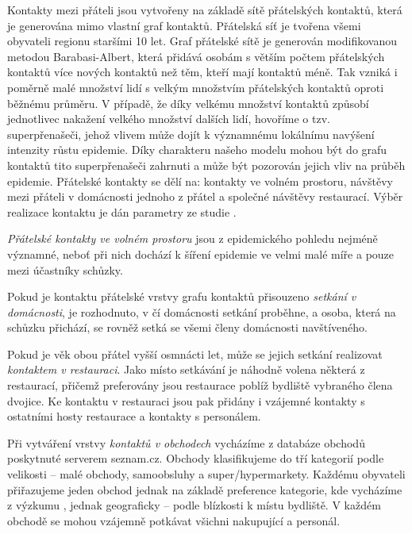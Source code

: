 Kontakty mezi přáteli jsou vytvořeny na základě sítě přátelských kontaktů, která je generována mimo vlastní graf kontaktů. Přátelská síť je tvořena všemi obyvateli regionu staršími 10 let. Graf přátelské sítě je generován modifikovanou metodou Barabasi-Albert, která přidává osobám s větším počtem přátelských kontaktů více nových kontaktů než těm, kteří mají kontaktů méně. Tak vzniká i poměrně malé množství lidí s velkým množstvím přátelských kontaktů oproti běžnému průměru. V případě, že díky velkému množství kontaktů způsobí jednotlivec nakažení velkého množství dalších lidí, hovoříme o tzv. superpřenašeči, jehož vlivem může dojít k významnému lokálnímu navýšení intenzity růstu epidemie. Díky charakteru našeho modelu mohou být do grafu kontaktů tito superpřenašeči zahrnuti a může být pozorován jejich vliv na průběh epidemie.
Přátelské kontakty se dělí na: kontakty ve volném prostoru, návštěvy mezi přáteli v domácnosti jednoho z přátel a společné návštěvy restaurací. Výběr realizace kontaktu je dán parametry ze studie \cite{zaj:medianlife}.

\emph{Přátelské kontakty ve volném prostoru} jsou z epidemického pohledu nejméně významné, neboť při nich dochází k šíření epidemie ve velmi malé míře a pouze mezi účastníky schůzky.

Pokud je kontaktu přátelské vrstvy grafu kontaktů přisouzeno \emph{setkání v domácnosti}, je rozhodnuto, v čí domácnosti setkání proběhne, a osoba, která na schůzku přichází, se rovněž setká se všemi členy domácnosti navštíveného.

Pokud je věk obou přátel vyšší osmnácti let, může se jejich setkání realizovat \emph{kontaktem v restauraci}. Jako místo setkávání je náhodně volena některá z restaurací, přičemž preferovány jsou restaurace poblíž bydliště vybraného člena dvojice. Ke kontaktu v restauraci jsou pak přidány i vzájemné kontakty s ostatními hosty restaurace a kontakty s personálem.


Při vytváření vrstvy \emph{kontaktů v obchodech} vycházíme z databáze obchodů poskytnuté serverem seznam.cz. Obchody klasifikujeme do tří kategorií podle velikosti -- malé obchody, samoobsluhy a super/hypermarkety. Každému obyvateli přiřazujeme jeden obchod jednak na základě preference kategorie, kde vycházíme z výzkumu \cite{zaj:medianlife}, jednak geograficky -- podle blízkosti k místu bydliště. V každém obchodě se mohou vzájemně potkávat všichni nakupující a personál.

